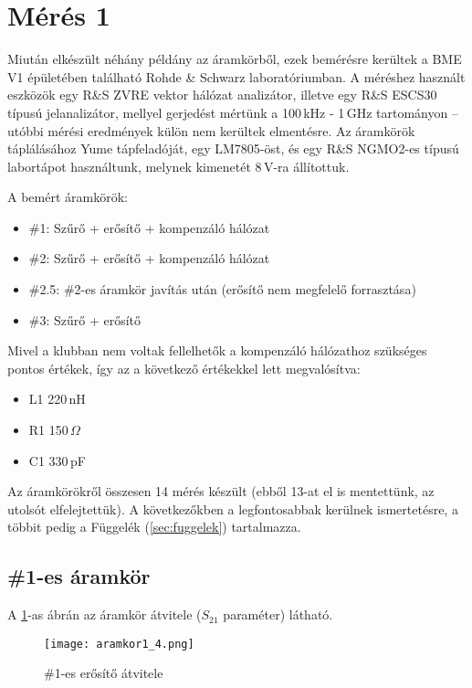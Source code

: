 \section{Mérés 1}
\label{sec:meres1}

Miután elkészült néhány példány az áramkörből, ezek bemérésre kerültek a BME V1 épületében található Rohde \& Schwarz laboratóriumban. A méréshez használt eszközök egy R\&S ZVRE vektor hálózat analizátor, illetve egy R\&S ESCS30 típusú jelanalizátor, mellyel gerjedést mértünk a 100\,kHz - 1\,GHz tartományon -- utóbbi mérési eredmények külön nem kerültek elmentésre. Az áramkörök táplálásához Yume tápfeladóját, egy LM7805-öst, és egy R\&S NGMO2-es típusú labortápot használtunk, melynek kimenetét 8\,V-ra állítottuk.

A bemért áramkörök:

\begin{itemize}
	\item \#1: Szűrő + erősítő + kompenzáló hálózat
	\item \#2: Szűrő + erősítő + kompenzáló hálózat
	\item \#2.5: \#2-es áramkör javítás után (erősítő nem megfelelő forrasztása)
	\item \#3: Szűrő + erősítő
\end{itemize}

\newpage

Mivel a klubban nem voltak fellelhetők a kompenzáló hálózathoz szükséges pontos értékek, így az a következő értékekkel lett megvalósítva:

\begin{itemize}
	\item L1 220\,nH
	\item R1 150\,$\Omega$
	\item C1 330\,pF
\end{itemize}

Az áramkörökről összesen 14 mérés készült (ebből 13-at el is mentettünk, az utolsót elfelejtettük). A következőkben a legfontosabbak kerülnek ismertetésre, a többit pedig a Függelék (\ref{sec:fuggelek}) tartalmazza.

\subsection{\#1-es áramkör}
\label{subsec:1es_aramkor}

A \ref{fig:erosito1}-as ábrán az áramkör átvitele ($S_{21}$ paraméter) látható.

\begin{figure}[!ht]
	\centering
	\texttt{[image: aramkor1\_4.png]}
	\caption{\#1-es erősítő átvitele}
	\label{fig:erosito1}
\end{figure}

